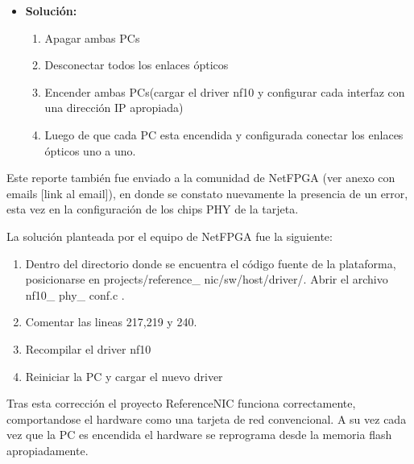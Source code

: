 \begin{itemize}
\item \textbf{Soluci\'on:}
\begin{enumerate}
\item Apagar ambas PCs
\item Desconectar todos los enlaces \'opticos
\item Encender ambas PCs(cargar el driver nf10 y configurar cada interfaz con una direcci\'on IP apropiada)
\item Luego de que cada PC esta encendida y configurada conectar los enlaces \'opticos uno a uno.
\end{enumerate}

\end{itemize}

Este reporte tambi\'en fue enviado a la comunidad de NetFPGA (ver anexo con emails [link al email]), en donde se constato nuevamente la presencia de un error, esta vez en la configuraci\'on de los chips PHY de la tarjeta. 

La soluci\'on planteada por el equipo de NetFPGA fue la siguiente:

\begin{enumerate}
\item Dentro del directorio donde se encuentra el c\'odigo fuente de la plataforma, posicionarse en 
	  projects/reference\_ nic/sw/host/driver/. Abrir el archivo nf10\_ phy\_ conf.c .
\item Comentar las lineas 217,219 y 240.
\item Recompilar el driver nf10
\item Reiniciar la PC y cargar el nuevo driver
\end{enumerate}

Tras esta correcci\'on el proyecto ReferenceNIC funciona correctamente, comportandose el hardware como una tarjeta de red convencional. A su vez cada vez que la PC es encendida el hardware se reprograma desde la memoria flash apropiadamente.


